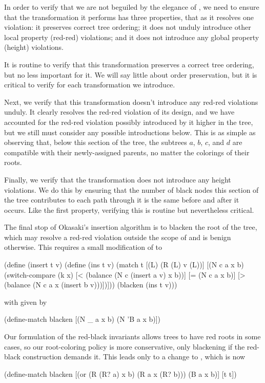 \documentclass[preprint]{sigplanconf}
\begin{document}
In order to verify that we are not beguiled by the elegance of , we need to ensure that the transformation it performs has three properties, that as it resolves one violation: it preserves correct tree ordering; it does not unduly introduce other local property (red-red) violations; and it does not introduce any global property (height) violations.

It is routine to verify that this transformation preserves a correct tree ordering, but no less important for it. We will say little about order preservation, but it is critical to verify for each transformation we introduce.

Next, we verify that this transformation doesn't introduce any red-red violations unduly. It clearly resolves the red-red violation of its design, and we have accounted for the red-red violation possibly introduced by it higher in the tree, but we still must consider any possible introductions below. This is as simple as observing that, below this section of the tree, the subtrees $a$, $b$, $c$, and $d$ are compatible with their newly-assigned parents, no matter the colorings of their roots.

Finally, we verify that the transformation does not introduce any height violations. We do this by ensuring that the number of black nodes this section of the tree contributes to each path through it is the same before and after it occurs. Like the first property, verifying this is routine but nevertheless critical.

The final stop of Okasaki's insertion algorithm is to blacken the root of the tree, which may resolve a red-red violation outside the scope of  and is benign otherwise. This requires a small modification of  to 
\begin{schemedisplay}
(define (insert t v)
  (define (ins t v)
    (match t
      [(L) (R (L) v (L))]
      [(N c a x b)
       (switch-compare
         (k x)
         [< (balance (N c (insert a v) x b))]
         [= (N c a x b)]
         [> (balance (N c a x (insert b v)))])]))
  (blacken (ins t v)))
\end{schemedisplay}
with  given by
\begin{schemedisplay}
(define-match blacken
  [(N _ a x b) (N 'B a x b)])
\end{schemedisplay}
Our formulation of the red-black invariants allows trees to have red roots in some cases, so our root-coloring policy is more conservative, only blackening if the red-black construction demands it. This leads only to a change to , which is now
\begin{schemedisplay}
(define-match blacken
  [(or (R (R? a) x b)
       (R a x (R? b)))
   (B a x b)]
  [t t])
\end{schemedisplay}
\end{document}

